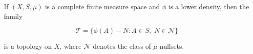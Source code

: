 If $(X, S, \mu)$ is a complete finite measure space and $\phi$ is a lower density, then the family

$$\mathcal{T} = \{\phi(A) - N : A \in S,\; N \in \mathcal{N}\}$$

is a topology on $X$, where $\mathcal{N}$ denotes the class of $\mu$-nullsets.
